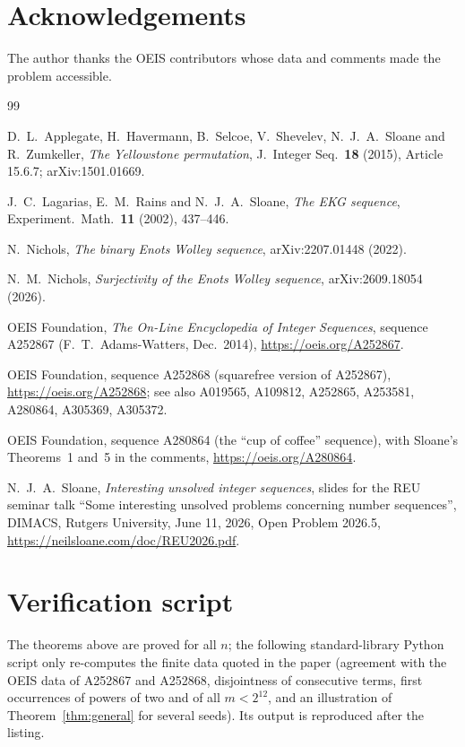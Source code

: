 \documentclass[11pt]{amsart}
\theoremstyle{definition}
\theoremstyle{remark}
\begin{document}
\section*{Acknowledgements}
The author thanks the OEIS contributors whose data and comments made the problem accessible.

\begin{thebibliography}{99}

D.~L.~Applegate, H.~Havermann, B.~Selcoe, V.~Shevelev, N.~J.~A.~Sloane and R.~Zumkeller,
\emph{The Yellowstone permutation}, J.\ Integer Seq.\ \textbf{18} (2015), Article 15.6.7;
arXiv:1501.01669.

J.~C.~Lagarias, E.~M.~Rains and N.~J.~A.~Sloane, \emph{The EKG sequence}, Experiment.\ Math.\
\textbf{11} (2002), 437--446.

N.~Nichols, \emph{The binary Enots Wolley sequence}, arXiv:2207.01448 (2022).

N.~M.~Nichols, \emph{Surjectivity of the Enots Wolley sequence}, arXiv:2609.18054 (2026).

OEIS Foundation, \emph{The On-Line Encyclopedia of Integer Sequences}, sequence A252867
(F.~T.~Adams-Watters, Dec.\ 2014), \url{https://oeis.org/A252867}.

OEIS Foundation, sequence A252868 (squarefree version of A252867),
\url{https://oeis.org/A252868}; see also A019565, A109812, A252865, A253581, A280864,
A305369, A305372.

OEIS Foundation, sequence A280864 (the ``cup of coffee'' sequence), with Sloane's Theorems~1
and~5 in the comments, \url{https://oeis.org/A280864}.

N.~J.~A.~Sloane, \emph{Interesting unsolved integer sequences}, slides for the REU seminar talk
``Some interesting unsolved problems concerning number sequences'', DIMACS, Rutgers University,
June 11, 2026, Open Problem 2026.5, \url{https://neilsloane.com/doc/REU2026.pdf}.

\end{thebibliography}

\appendix
\section{Verification script}\label{app:script}
The theorems above are proved for all $n$; the following standard-library Python script only
re-computes the finite data quoted in the paper (agreement with the OEIS data of A252867 and
A252868, disjointness of consecutive terms, first occurrences of powers of two and of all
$m<2^{12}$, and an illustration of Theorem~\ref{thm:general} for several seeds). Its output is
reproduced after the listing.
\end{document}

